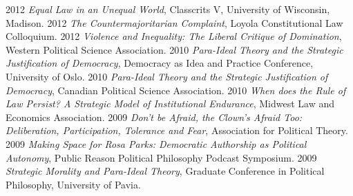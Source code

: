 \documentclass[letterpaper]{moderncv}
\begin{document}
\vspace{1mm}
\cvitem
{2012}
{\textit{Equal Law in an Unequal World}, Classcrits V, University of Wisconsin, Madison.}
\vspace{1mm}
\cvitem
{2012}
{\textit{The Countermajoritarian Complaint}, Loyola Constitutional Law Colloquium.}
\vspace{1mm}
\cvitem
{2012}
{\textit{Violence and Inequality: The Liberal Critique of Domination}, Western Political Science Association.}
\vspace{1mm}
\cvitem
{2010}
{\textit{Para-Ideal Theory and the Strategic Justification of Democracy}, Democracy as Idea and Practice Conference, University of Oslo.}
\vspace{1mm}
\cvitem
{2010}
{\textit{Para-Ideal Theory and the Strategic Justification of Democracy}, Canadian Political Science Association.}
\vspace{1mm}
\cvitem
{2010}
{\textit{When does the Rule of Law Persist? A Strategic Model of Institutional Endurance}, Midwest Law and Economics Association.}
\vspace{1mm}
\cvitem
{2009}
{\textit{Don't be Afraid, the Clown's Afraid Too: Deliberation, Participation, Tolerance and Fear}, Association for Political Theory.}
\vspace{1mm}
\cvitem
{2009}
{\textit{Making Space for Rosa Parks: Democratic Authorship as Political Autonomy}, Public Reason Political Philosophy Podcast Symposium.}
\vspace{1mm}
\cvitem
{2009}
{\textit{Strategic Morality and Para-Ideal Theory}, Graduate Conference in Political Philosophy, University of Pavia.}
\vspace{1mm}
\end{document}
